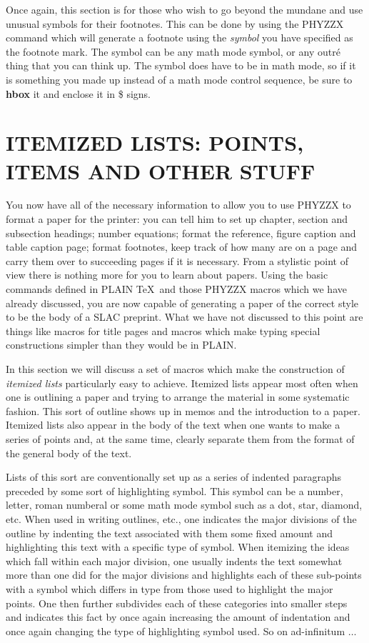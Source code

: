 Once again, this section is for those who wish to go beyond
the mundane and use unusual symbols for their footnotes.
This can be done by using the PHYZZX command
which will generate a footnote using the {\it symbol} you have
specified as the footnote mark.
The symbol can be any math mode symbol, or any outr\'e thing
that you can think up.
The symbol does have to be in math mode, so if it is something
you made up instead of a math mode control sequence, be sure to
{\bf \\hbox} it and enclose it in \$ signs.
 
\chapter{ITEMIZED LISTS: POINTS, ITEMS AND OTHER STUFF}
 
You now have all of the necessary information to allow you
to use PHYZZX to format a paper for the printer:  you can
tell him to set up chapter, section and subsection headings;
number equations; format the reference, figure caption and
table caption page; format footnotes, keep track of how
many are on a page and carry them over to succeeding pages if
it is necessary.
From a stylistic point of view there is nothing more for you
to learn about papers.
Using the basic commands defined in PLAIN \TeX\ and those
PHYZZX macros which we have already discussed, you are now
capable of generating a paper of the correct style to be
the body of a SLAC preprint.
What we have not discussed to this point are things like macros for
title pages and macros which make typing special constructions
simpler than they would be in PLAIN.
 
In this section we will discuss a set of
macros which make the construction
of {\it itemized lists} particularly easy to achieve.
Itemized lists appear most often when one is outlining a paper
and trying to arrange the material in some systematic fashion.
This sort of outline shows up in memos and the introduction to a
paper.
Itemized lists also appear in the body of the text when one wants
to make a series of points and, at the same time, clearly separate them
from the format of the general body of the text.
 
Lists of this sort are conventionally set up as a series of indented
paragraphs preceded by some sort of highlighting symbol.
This symbol can be a number, letter, roman numberal or some math
mode symbol such as a dot, star, diamond, etc.
When used in writing outlines, etc., one indicates the major divisions of
the outline by indenting the text associated with
them some fixed amount and highlighting this text with a specific
type of symbol.
When itemizing the ideas which fall within each major division, one
usually indents the text somewhat more than one did for the major
divisions and highlights each of these sub-points with a symbol
which differs in type from those used to highlight the major points.
One then further subdivides each of these categories into smaller
steps and indicates this fact by once again increasing the amount of
indentation and once again changing the type of highlighting symbol used.
So on ad-infinitum $\ldots$
 
